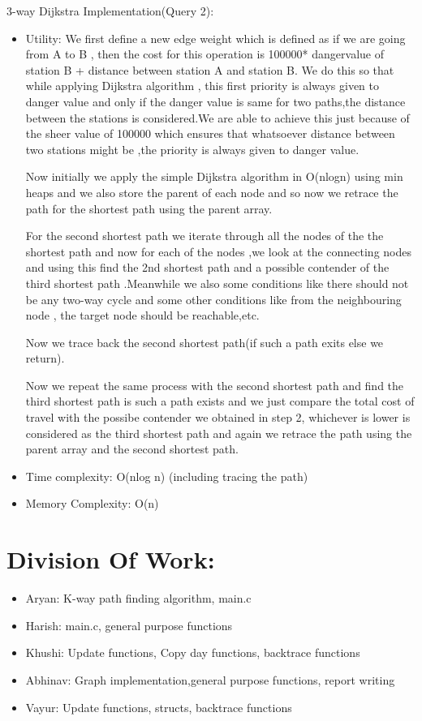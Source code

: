 \documentclass{article}
\begin{document}
3-way Dijkstra Implementation(Query 2): 
	{\begin{itemize}
        \item Utility: We first define a new edge weight which is defined as if we are going from A to B , then the cost for this operation is 100000* dangervalue of station B + distance between station A and station B. We do this so that while applying Dijkstra algorithm , this first priority is always given to danger value and only if the danger value is same for two paths,the distance between the stations is considered.We are able to achieve this just because of the sheer value of 100000 which ensures that whatsoever distance between two stations might be ,the priority is always given to danger value.
        
Now initially we apply the simple Dijkstra algorithm in O(nlogn) using min heaps and we also store the parent of each node and so now we retrace the path for the shortest path using the parent array.

For the second shortest path we iterate through all the nodes of the the shortest path and now for each of the nodes ,we look at the connecting nodes and using this find the 2nd shortest path and a possible contender of the third shortest path .Meanwhile we also some conditions like there should not be any two-way cycle and some other conditions like from the neighbouring node , the target node should be reachable,etc.

Now we trace back the second shortest path(if such a path exits else we return).

Now we repeat the same process with the second shortest path and find the third shortest path is such a path exists and we just compare the total cost of travel with the possibe contender we obtained in step 2, whichever is lower is considered as the third shortest path and again we retrace the path using the parent array and the second shortest path.


		\item Time complexity: O(nlog n) (including tracing the path)
	    \item Memory Complexity: O(n)
    \end{itemize}
	}


\newpage
\section{Division Of Work:}
\begin{itemize}
\item Aryan: K-way path finding algorithm, main.c
\item Harish: main.c, general purpose functions
\item Khushi: Update functions, Copy day functions, backtrace functions
\item Abhinav: Graph implementation,general purpose functions, report writing
\item Vayur: Update functions, structs, backtrace functions


\end{itemize}
\end{document}

